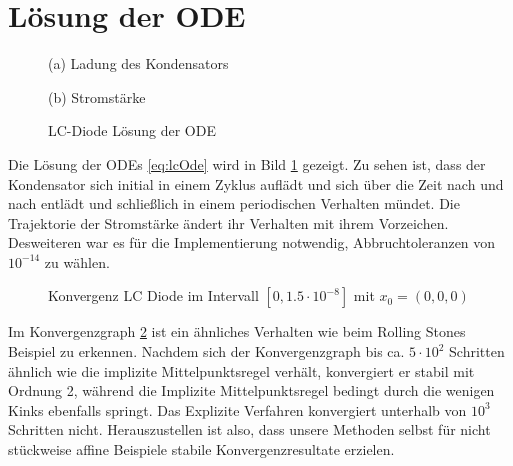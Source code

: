 \section{Lösung der ODE}
\begin{figure}[H]
\footnotesize 
\centering
\begin{minipage}[b]{0.49\linewidth}

\caption*{(a) Ladung des Kondensators}
\end{minipage}
\begin{minipage}[b]{0.49\linewidth}

\caption*{(b) Stromstärke}
\end{minipage}
\caption{LC-Diode Lösung der ODE}
\label{fig:lc_solution}
\end{figure}
Die Lösung der ODEs \eqref{eq:lcOde} wird in Bild \ref{fig:lc_solution} gezeigt. Zu sehen ist, dass der Kondensator sich initial in einem Zyklus auflädt und sich über die Zeit nach und nach entlädt und schließlich in einem periodischen Verhalten mündet. Die Trajektorie der Stromstärke ändert ihr Verhalten mit ihrem Vorzeichen. Desweiteren war es für die Implementierung notwendig, Abbruchtoleranzen von $10^{-14}$ zu wählen. 

\begin{figure}
\centering

\caption{Konvergenz LC Diode im Intervall $[0,1.5\cdot 10^{-8}]$ mit $x_0=(0,0,0)$}
\label{fig:lcConvergence}
\end{figure}
Im Konvergenzgraph \ref{fig:lcConvergence} ist ein ähnliches Verhalten wie beim Rolling Stones Beispiel zu erkennen. Nachdem sich der Konvergenzgraph bis ca. $5\cdot 10^2$ Schritten ähnlich wie die implizite Mittelpunktsregel verhält, konvergiert er stabil mit Ordnung 2, während die Implizite Mittelpunktsregel bedingt durch die wenigen Kinks ebenfalls springt. Das Explizite Verfahren konvergiert unterhalb von $10^3$ Schritten nicht. 
Herauszustellen ist also, dass unsere Methoden selbst für nicht stückweise affine Beispiele stabile Konvergenzresultate erzielen.

